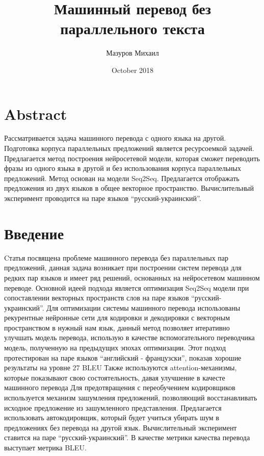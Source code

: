\documentclass{article}
\title{Машинный перевод без параллельного текста}
\author{ Мазуров Михаил }
\date{ October 2018}
\begin{document}
\maketitle
\section{Abstract}
 Рассматривается задача машинного перевода с одного языка на другой. Подготовка корпуса параллельных предложений является ресурсоемкой задачей. Предлагается метод построения нейросетевой модели, которая сможет переводить фразы из одного языка в другой и без использования корпуса параллельных предложений. Метод основан на модели Seq2Seq. Предлагается отображать предложения из двух языков в общее векторное пространство. Вычислительный эксперимент проводится на паре языков ``русский-украинский''.
\section{Введение}
Cтатья посвящена проблеме машинного перевода без параллельных пар предложений,
данная задача возникает при построении систем перевода для редких пар языков и имеет ряд решений, основанных на нейросетевом машинном переводе. 
Основной идеей подхода является оптимизация Seq2Seq модели при сопоставлении векторных пространств слов на паре языков ``русский-украинский''. \newline
Для оптимизации системы машинного перевода использованы рекурентные нейронные сети для кодировки и декодировки с векторным пространством в нужный нам язык, данный метод позволяет итеративно улучшать модель перевода, использую в качестве вспомогательного переводчика модель, полученную на предыдущих эпохах оптимизации. Этот подход протестирован на паре языков  ``английский - французски'', показав хорошие результаты на уровне 27 BLEU \cite{bahdanau2014neural} \newline
Также используются attention-механизмы, которые показывают свою состоятельность, давая улучшение в качесте машинного перевода \cite{luong2015effective} \newline
Для предотвращения с переобучением кодировщиков используется механизм зашумления предложений, позволяющий восстанавливать исходное предложение из зашумленного представления. Предлагается использовать автокодировщик, который будет учиться убирать шум в предложениях без перевода на другой
язык.\cite{kimimproving}
Вычислительный эксперимент ставится на паре ``русский-украинский''. В качестве метрики качества перевода выступает метрика BLEU. 
\end{document}
